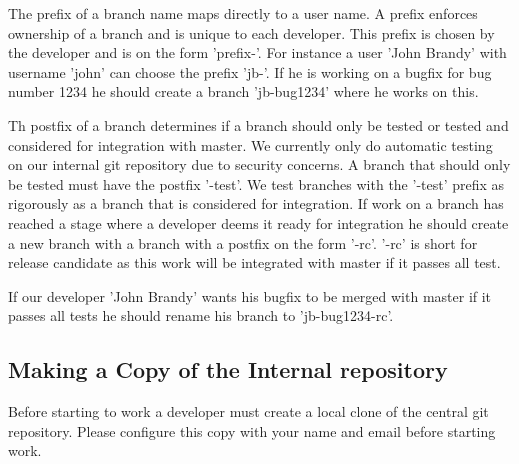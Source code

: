 The prefix of a branch name maps directly to a user name. A prefix enforces 
ownership of a branch and is unique to each developer. This prefix is chosen
by the developer and is on the form 'prefix-'. For instance a user 'John Brandy' 
with username 'john' can choose the prefix 'jb-'. If he is working on a bugfix
for bug number 1234 he should create a branch 'jb-bug1234' where he works on this.

Th postfix of a branch determines if a branch should only be tested or tested and
considered for integration with master. We currently only do automatic testing on
our internal git repository due to security concerns. A branch that should only be 
tested must have the postfix '-test'. We test branches with the '-test' prefix as 
rigorously as a branch that is considered for integration. If work on a branch has
reached a stage where a developer deems it ready for integration he should create
a new branch with a branch with a postfix on the form '-rc'. '-rc' is short for
release candidate as this work will be integrated with master if it passes all test.

If our developer 'John Brandy' wants his bugfix to be merged with master if it passes
all tests he should rename his branch to 'jb-bug1234-rc'.


\subsection{Making a Copy of the Internal repository}



Before starting to work a developer must create a local clone of the central git repository.
Please configure this copy with your name and email before starting work.

